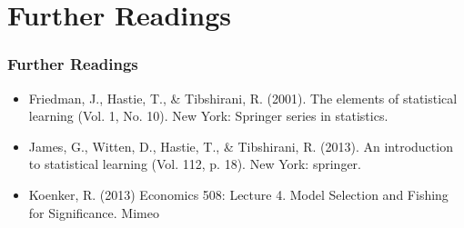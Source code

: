 \documentclass[
  shownotes,
  xcolor={svgnames},
  hyperref={colorlinks,citecolor=DarkBlue,linkcolor=DarkRed,urlcolor=DarkBlue}
  ]{beamer}
\begin{document}
\section{Further Readings}
\begin{frame}
\frametitle{Further Readings}

\begin{itemize}


  \item Friedman, J., Hastie, T., \& Tibshirani, R. (2001). The elements of statistical learning (Vol. 1, No. 10). New York: Springer series in statistics.
  \medskip
  \item James, G., Witten, D., Hastie, T., \& Tibshirani, R. (2013). An introduction to statistical learning (Vol. 112, p. 18). New York: springer.
  \medskip
    \item Koenker, R. (2013) Economics 508: Lecture 4. Model Selection and Fishing for Significance. Mimeo

  
\end{itemize}

\end{frame}






\end{document}
